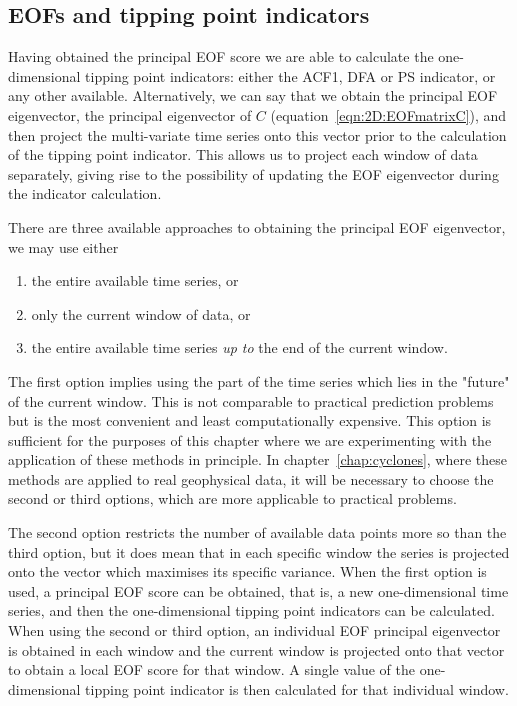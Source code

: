 \subsection{EOFs and tipping point indicators}
\label{subsec:2D:EOF:movingEOF}

Having obtained the principal EOF score we are able to calculate the one-dimensional tipping point indicators: either the ACF1, DFA or PS indicator, or any other available. Alternatively, we can say that we obtain the principal EOF eigenvector, the principal eigenvector of $C$ (equation~\ref{eqn:2D:EOFmatrixC}), and then project the multi-variate time series onto this vector prior to the calculation of the tipping point indicator. This allows us to project each window of data separately, giving rise to the possibility of updating the EOF eigenvector during the indicator calculation. 

There are three available approaches to obtaining the principal EOF eigenvector, we may use either
\begin{enumerate}
	\item the entire available time series, or
	\item only the current window of data, or
	\item the entire available time series \emph{up to} the end of the current window.
\end{enumerate}
The first option implies using the part of the time series which lies in the "future" of the current window. This is not comparable to practical prediction problems but is the most convenient and least computationally expensive. This option is sufficient for the purposes of this chapter where we are experimenting with the application of these methods in principle. In chapter~\ref{chap:cyclones}, where these methods are applied to real geophysical data, it will be necessary to choose the second or third options, which are more applicable to practical problems. 

The second option restricts the number of available data points more so than the third option, but it does mean that in each specific window the series is projected onto the vector which maximises its specific variance. When the first option is used, a principal EOF score can be obtained, that is, a new one-dimensional time series, and then the one-dimensional tipping point indicators can be calculated. When using the second or third option, an individual EOF principal eigenvector is obtained in each window and the current window is projected onto that vector to obtain a local EOF score for that window. A single value of the one-dimensional tipping point indicator is then calculated for that individual window. 

